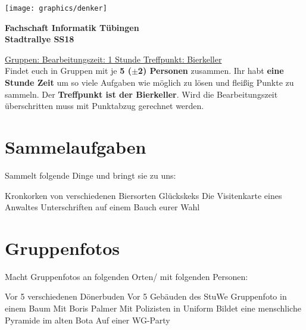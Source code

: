 \documentclass[11pt,paper=a4,answers]{exam}
\renewenvironment{questions}{
	\begin{q}
		\pointsinrightmargin
		\marginpointname{Pkt}
		\pointpoints{Pkt}{Pkt}
		\bracketedpoints }{
	\end{q}}
\begin{document}
	
\noindent
\begin{minipage}[l]{.1\textwidth}
\noindent
\texttt{[image: graphics/denker]}
\end{minipage}
\begin{minipage}[r]{.8\textwidth}
\begin{center}
{\large \bfseries Fachschaft Informatik Tübingen \\
\Large Stadtrallye SS18 \par}
\end{center}
\end{minipage}
\par
\vspace{0.5cm}
\noindent
\uline{Gruppen:\hspace{2cm} \hfill Bearbeitungszeit: 1 Stunde   \hfill     Treffpunkt: Bierkeller}
\vspace{0.5cm}\\
Findet euch in Gruppen mit je \textbf{5 ($\pm$2) Personen} zusammen. Ihr habt \textbf{eine Stunde Zeit} um so viele Aufgaben wie möglich zu lösen und fleißig Punkte zu sammeln. Der \textbf{Treffpunkt ist der Bierkeller}. Wird die Bearbeitungszeit überschritten muss mit Punktabzug gerechnet werden.
\section*{Sammelaufgaben}
	Sammelt folgende Dinge und bringt sie zu uns:
	\begin{questions}
		 Kronkorken von verschiedenen Biersorten
		 Glückskeks
		\question[7] Die Visitenkarte eines Anwaltes
		 Unterschriften auf einem Bauch eurer Wahl
	
	\end{questions}

\section*{Gruppenfotos}
	Macht Gruppenfotos an folgenden Orten/ mit folgenden Personen:
	\begin{questions}
		\question[5] Vor 5 verschiedenen Dönerbuden
		\question[5] Vor 5 Gebäuden des StuWe 
		\question[10] Gruppenfoto in einem Baum
		\question[30] Mit Boris Palmer
		\question[5] Mit Polizisten in Uniform
		 Bildet eine menschliche Pyramide im alten Bota 
		 Auf einer WG-Party
	
	\end{questions}
\end{document}

